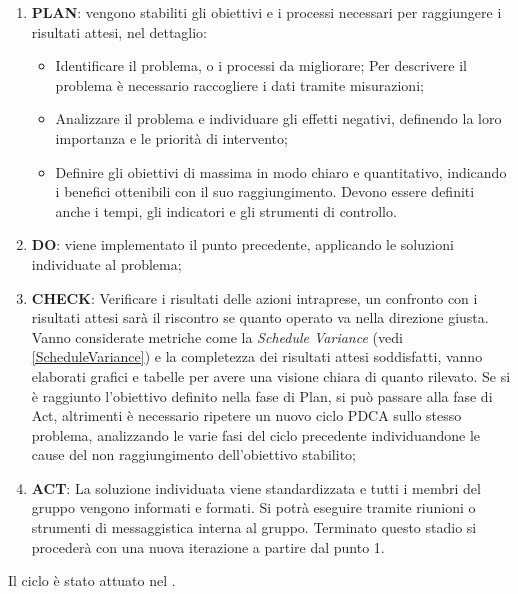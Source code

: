 	\begin{enumerate}
		\item \textbf{PLAN}: vengono stabiliti gli obiettivi e i processi necessari per raggiungere i risultati attesi, nel dettaglio:
		\begin{itemize}
			\item Identificare il problema, o i processi da migliorare; Per descrivere il problema è necessario raccogliere i dati tramite misurazioni;
			\item Analizzare il problema e individuare gli effetti negativi, definendo la loro importanza e le priorità di intervento;
			\item Definire gli obiettivi di massima in modo chiaro e quantitativo, indicando i benefici ottenibili con il suo raggiungimento. Devono essere definiti anche i tempi, gli indicatori e gli strumenti di controllo.
		\end{itemize}				
		\item \textbf{DO}: viene implementato il punto precedente, applicando le soluzioni individuate al problema;
		\item \textbf{CHECK}: Verificare i risultati delle azioni intraprese, un confronto con i risultati attesi sarà il riscontro se quanto operato va nella direzione giusta. Vanno considerate metriche come la \emph{Schedule Variance} (vedi \ref{ScheduleVariance}) e la completezza dei risultati attesi soddisfatti, vanno elaborati grafici e tabelle per avere una visione chiara di quanto rilevato. 
		Se si è raggiunto l'obiettivo definito nella fase di Plan, si può passare alla fase di Act, altrimenti è necessario ripetere un nuovo ciclo PDCA sullo stesso problema, analizzando le varie fasi del ciclo precedente individuandone le cause del non raggiungimento dell'obiettivo stabilito;
		\item \textbf{ACT}: La soluzione individuata viene standardizzata  e tutti i membri del gruppo vengono informati e formati. Si potrà eseguire tramite riunioni o strumenti di messaggistica interna al gruppo. Terminato questo stadio si procederà con una nuova iterazione a partire dal punto 1.
	\end{enumerate}

Il ciclo  è stato attuato nel \PianoDiProgetto. 

